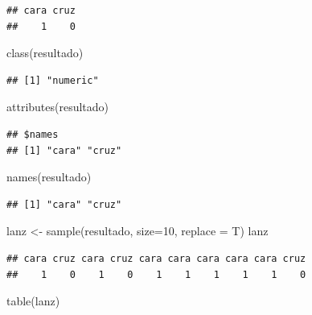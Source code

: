 \documentclass[
]{book}
\newenvironment{Shaded}{\begin{snugshade}}{\end{snugshade}}
\newcommand{\AttributeTok}[1]{\textcolor[rgb]{0.77,0.63,0.00}{#1}}
\newcommand{\DecValTok}[1]{\textcolor[rgb]{0.00,0.00,0.81}{#1}}
\newcommand{\FunctionTok}[1]{\textcolor[rgb]{0.00,0.00,0.00}{#1}}
\newcommand{\NormalTok}[1]{#1}
\newcommand{\OtherTok}[1]{\textcolor[rgb]{0.56,0.35,0.01}{#1}}
\theoremstyle{break}
\theoremstyle{nonumberplain}
\begin{document}
\begin{verbatim}
## cara cruz 
##    1    0
\end{verbatim}

\begin{Shaded}
\begin{Highlighting}[]
\FunctionTok{class}\NormalTok{(resultado)}
\end{Highlighting}
\end{Shaded}

\begin{verbatim}
## [1] "numeric"
\end{verbatim}

\begin{Shaded}
\begin{Highlighting}[]
\FunctionTok{attributes}\NormalTok{(resultado)}
\end{Highlighting}
\end{Shaded}

\begin{verbatim}
## $names
## [1] "cara" "cruz"
\end{verbatim}

\begin{Shaded}
\begin{Highlighting}[]
\FunctionTok{names}\NormalTok{(resultado)}
\end{Highlighting}
\end{Shaded}

\begin{verbatim}
## [1] "cara" "cruz"
\end{verbatim}

\begin{Shaded}
\begin{Highlighting}[]
\NormalTok{lanz }\OtherTok{\textless{}{-}} \FunctionTok{sample}\NormalTok{(resultado, }\AttributeTok{size=}\DecValTok{10}\NormalTok{, }\AttributeTok{replace =}\NormalTok{ T)}
\NormalTok{lanz}
\end{Highlighting}
\end{Shaded}

\begin{verbatim}
## cara cruz cara cruz cara cara cara cara cara cruz 
##    1    0    1    0    1    1    1    1    1    0
\end{verbatim}

\begin{Shaded}
\begin{Highlighting}[]
\FunctionTok{table}\NormalTok{(lanz)}
\end{Highlighting}
\end{Shaded}
\end{document}
